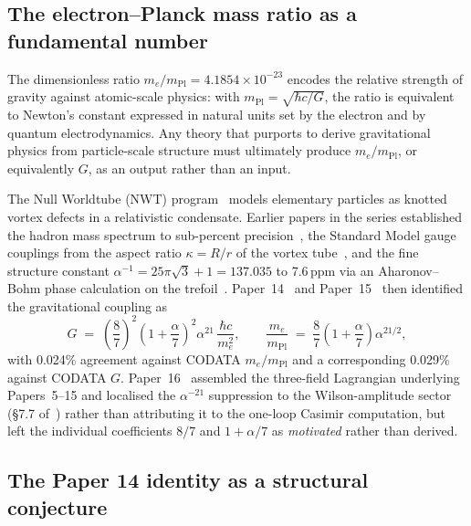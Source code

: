 \documentclass[11pt]{article}
\newcommand{\mPl}{m_{\mathrm{Pl}}}
\begin{document}
\subsection{The electron--Planck mass ratio as a fundamental number}
\label{sec:intro-motivation}

The dimensionless ratio $m_e/\mPl = 4.1854\times 10^{-23}$ encodes the
relative strength of gravity against atomic-scale physics: with
$\mPl = \sqrt{\hbar c / G}$, the ratio is equivalent to
Newton's constant expressed in natural units set by the electron and
by quantum electrodynamics.  Any theory that purports to derive
gravitational physics from particle-scale structure must ultimately
produce $m_e/\mPl$, or equivalently $G$, as an output rather than an
input.

The Null Worldtube (NWT) program~\cite{paper5,paper6,paper7,paper8,paper8a,paper10,paper13}
models elementary particles as knotted vortex defects in a
relativistic condensate.  Earlier papers in the series established
the hadron mass spectrum to sub-percent precision~\cite{paper6},
the Standard Model gauge couplings from the aspect ratio
$\kappa = R/r$ of the vortex tube~\cite{paper8a}, and the fine
structure constant $\alpha^{-1} = 25\pi\sqrt{3} + 1 = 137.035$ to
7.6\,ppm via an Aharonov--Bohm phase calculation on the
trefoil~\cite{paper8a,paper13}.  Paper~14~\cite{paper14} and
Paper~15~\cite{paper15} then identified the gravitational coupling
as
\begin{equation}
  G \;=\; \left(\frac{8}{7}\right)^2
           \left(1 + \frac{\alpha}{7}\right)^2
           \alpha^{21}\,
           \frac{\hbar c}{m_e^2},
  \qquad
  \frac{m_e}{\mPl} \;=\; \frac{8}{7}
           \left(1 + \frac{\alpha}{7}\right)
           \alpha^{21/2},
  \label{eq:paper14-formula}
\end{equation}
with 0.024\% agreement against CODATA $m_e/\mPl$ and a corresponding
0.029\% against CODATA $G$.  Paper~16~\cite{paper16} assembled the
three-field Lagrangian underlying Papers~5--15 and localised the
$\alpha^{-21}$ suppression to the Wilson-amplitude sector
(\S7.7 of~\cite{paper16}) rather than attributing it to the
one-loop Casimir computation, but left the individual coefficients
$8/7$ and $1+\alpha/7$ as \emph{motivated} rather than derived.

\subsection{The Paper 14 identity as a structural conjecture}
\label{sec:intro-gap}
\end{document}
